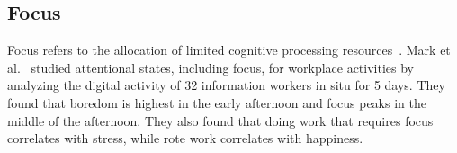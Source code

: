 








\subsection{Focus}
Focus refers to the allocation of limited cognitive processing resources~\cite{Anderson04}.
Mark et al.~\cite{mark2014bored} studied attentional states, including focus, for workplace activities by analyzing the digital activity of 32 information workers in situ for 5 days. They found that boredom is highest in the early afternoon and focus peaks in the middle of the afternoon. They also found that doing work that requires focus correlates with stress, while rote work correlates with happiness.

